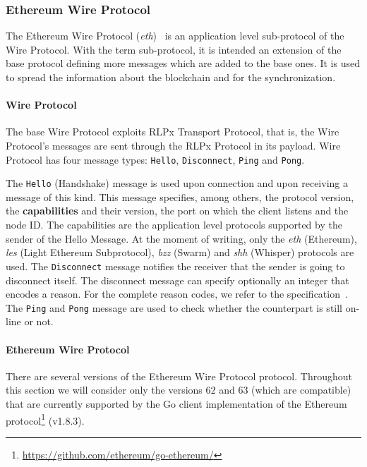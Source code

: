 \subsubsection{Ethereum Wire Protocol}
\label{sec:ethereum-wire-protocol}

The Ethereum Wire Protocol (\emph{eth})~\cite{bib:ethereumwireprotocol}  is an
application level sub-protocol of the \devpp{} Wire Protocol. With the term
sub-protocol, it is intended an extension of the base protocol defining more
messages which are added to the base ones. It is used to spread the information
about the blockchain and for the synchronization.

\paragraph{\devpp{} Wire Protocol}
The base \devpp{} Wire Protocol exploits RLPx Transport Protocol, that is, the
\devpp{} Wire Protocol's messages are sent through the RLPx Protocol in its
payload. \devpp{} Wire Protocol has four message types: \verb+Hello+,
\verb+Disconnect+, \verb+Ping+ and \verb+Pong+.

The \verb+Hello+ (Handshake) message is used upon connection and upon receiving
a message of this kind. This message specifies, among others, the protocol
version, the \textbf{capabilities} and their version, the port on which the
client listens and the node ID. The capabilities are the application level
protocols supported by the sender of the Hello Message. At the moment of
writing, only the \emph{eth} (Ethereum), \emph{les} (Light Ethereum
Subprotocol), \emph{bzz} (Swarm) and \emph{shh} (Whisper) protocols are used.
The \verb+Disconnect+ message notifies the receiver that the sender is going to
disconnect itself. The disconnect message can specify optionally an integer that
encodes a reason. For the complete reason codes, we refer to the \devpp{}
specification~\cite{devp2pwire}. The \verb+Ping+ and \verb+Pong+ message are
used to check whether the counterpart is still on-line or not.

\paragraph{Ethereum Wire Protocol}
There are several versions of the Ethereum Wire Protocol protocol. Throughout
this section we will consider only the versions $62$ and $63$ (which are
compatible) that are currently supported by the Go client implementation of the
Ethereum protocol\footnote{\url{https://github.com/ethereum/go-ethereum/}}
(v1.8.3).

